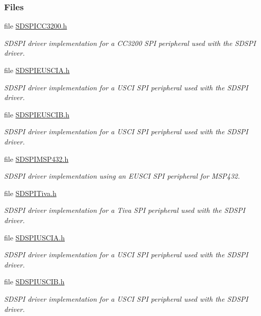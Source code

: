 \subsubsection*{Files}
\begin{DoxyCompactItemize}
\item 
file \hyperlink{_s_d_s_p_i_c_c3200_8h}{S\+D\+S\+P\+I\+C\+C3200.\+h}
\begin{DoxyCompactList}\small\item\em S\+D\+S\+P\+I driver implementation for a C\+C3200 S\+P\+I peripheral used with the S\+D\+S\+P\+I driver. \end{DoxyCompactList}\item 
file \hyperlink{_s_d_s_p_i_e_u_s_c_i_a_8h}{S\+D\+S\+P\+I\+E\+U\+S\+C\+I\+A.\+h}
\begin{DoxyCompactList}\small\item\em S\+D\+S\+P\+I driver implementation for a U\+S\+C\+I S\+P\+I peripheral used with the S\+D\+S\+P\+I driver. \end{DoxyCompactList}\item 
file \hyperlink{_s_d_s_p_i_e_u_s_c_i_b_8h}{S\+D\+S\+P\+I\+E\+U\+S\+C\+I\+B.\+h}
\begin{DoxyCompactList}\small\item\em S\+D\+S\+P\+I driver implementation for a U\+S\+C\+I S\+P\+I peripheral used with the S\+D\+S\+P\+I driver. \end{DoxyCompactList}\item 
file \hyperlink{_s_d_s_p_i_m_s_p432_8h}{S\+D\+S\+P\+I\+M\+S\+P432.\+h}
\begin{DoxyCompactList}\small\item\em S\+D\+S\+P\+I driver implementation using an E\+U\+S\+C\+I S\+P\+I peripheral for M\+S\+P432. \end{DoxyCompactList}\item 
file \hyperlink{_s_d_s_p_i_tiva_8h}{S\+D\+S\+P\+I\+Tiva.\+h}
\begin{DoxyCompactList}\small\item\em S\+D\+S\+P\+I driver implementation for a Tiva S\+P\+I peripheral used with the S\+D\+S\+P\+I driver. \end{DoxyCompactList}\item 
file \hyperlink{_s_d_s_p_i_u_s_c_i_a_8h}{S\+D\+S\+P\+I\+U\+S\+C\+I\+A.\+h}
\begin{DoxyCompactList}\small\item\em S\+D\+S\+P\+I driver implementation for a U\+S\+C\+I S\+P\+I peripheral used with the S\+D\+S\+P\+I driver. \end{DoxyCompactList}\item 
file \hyperlink{_s_d_s_p_i_u_s_c_i_b_8h}{S\+D\+S\+P\+I\+U\+S\+C\+I\+B.\+h}
\begin{DoxyCompactList}\small\item\em S\+D\+S\+P\+I driver implementation for a U\+S\+C\+I S\+P\+I peripheral used with the S\+D\+S\+P\+I driver. \end{DoxyCompactList}\end{DoxyCompactItemize}
